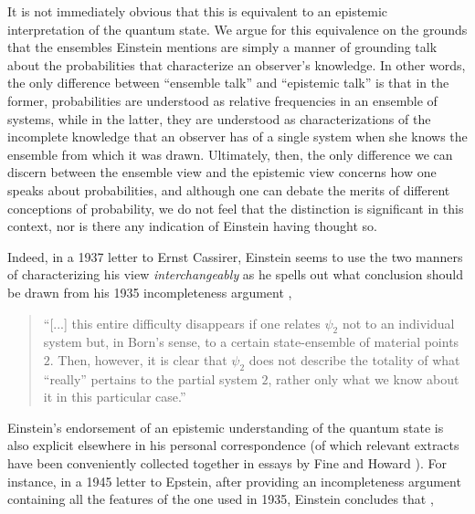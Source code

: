 \documentclass[aps,nofootinbib,12pt]{revtex4-2}
\begin{document}
It is not immediately obvious that this is equivalent to an
epistemic interpretation of the quantum state. We argue for this
equivalence on the grounds that the ensembles Einstein mentions are
simply a manner of grounding talk about the probabilities that
characterize an observer's knowledge. In other words, the only
difference between ``ensemble talk'' and ``epistemic talk'' is that
in the former, probabilities are understood as relative frequencies
in an ensemble of systems, while in the latter, they are understood
as characterizations of the incomplete knowledge that an observer
has of a single system when she knows the ensemble from which it was
drawn. Ultimately, then, the only difference we can discern between
the ensemble view and the epistemic view concerns how one speaks
about probabilities, and although one can debate the merits of
different conceptions of probability, we do not feel that the
distinction is significant in this context, nor is there any
indication of Einstein having thought so.

Indeed, in a 1937 letter to Ernst Cassirer, Einstein seems to use
the two manners of characterizing his view \emph{interchangeably} as
he spells out what conclusion should be drawn from his 1935
incompleteness argument \cite{EtoCassirer},

\begin{quote}
``[...] this entire difficulty disappears if one relates $\psi_{2}$
not to an individual system but, in Born's sense, to a certain
state-ensemble of material points $2$. Then, however, it is clear
that $\psi_{2}$ does not describe the totality of what ``really''
pertains to the partial system $2$, rather only what we know about
it in this particular case.''
\end{quote}

\strut Einstein's endorsement of an epistemic understanding of the
quantum state is also explicit elsewhere in his personal
correspondence (of which relevant extracts have been conveniently
collected together in essays by Fine and Howard
\cite{Fine:Eincontext,Howard_einst_short,Howard_einst_long}). For
instance, in a 1945 letter to Epstein, after providing an
incompleteness argument containing all the features of the one used
in 1935, Einstein concludes that \cite{EtoEpstein},
\end{document}
